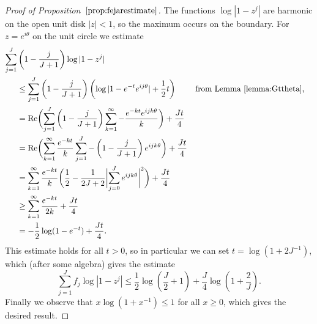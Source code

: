 \begin{proof}[Proof of Proposition~$\ref{prop:fejarestimate}$]
The functions $\log|1-z^j|$ are harmonic on the open unit disk $|z|<1$,
so the maximum occurs on the boundary. For $z=e^{i\theta}$ on the unit
circle we estimate
\begin{align*}
  \sum_{j=1}^J&\left(1-\frac{j}{J+1}\right)\log|1-z^j|\\
  &\le \sum_{j=1}^J \left(1-\frac{j}{J+1}\right) 
                    \left(\log|1-e^{-t}e^{ij\theta}| + \frac12t\right)
   &&\text{from Lemma \ref{lemma:Gttheta},} \\
  &= {\operatorname{Re}}\biggl(
      \sum_{j=1}^J \left(1-\frac{j}{J+1}\right) 
                       \sum_{k=1}^\infty -\frac{e^{-kt}e^{ijk\theta}}{k} \biggr)
     + \frac{Jt}{4} \\
  &= {\operatorname{Re}}\biggl(
      \sum_{k=1}^\infty \frac{e^{-kt}}{k}\sum_{j=1}^J 
          -\left(1-\frac{j}{J+1}\right)e^{ijk\theta} \biggr)+ \frac{Jt}{4} \\
  &=       \sum_{k=1}^\infty \frac{e^{-kt}}{k}
           \biggl(\frac12
           -\frac{1}{2J+2}\biggl|\sum_{j=0}^Je^{ijk\theta}\biggr|^2\biggr)
     + \frac{Jt}{4} \hidewidth\\
  &\ge \sum_{k=1}^\infty \frac{e^{-kt}}{2k} + \frac{Jt}{4} \\
  &= -\frac12\log(1-e^{-t}) + \frac{Jt}{4}.
\end{align*}
This estimate holds for all $t>0$, so in particular we can
set $t=\log(1+2J^{-1})$, which (after some algebra) gives the estimate
\[
  \sum_{j=1}^J f_j\log|1-z^j|
  \le \frac12\log\left(\frac{J}{2}+1\right)
      +\frac{J}{4}\log\left(1+\frac{2}{J}\right).
\]
Finally we observe that $x\log(1+x^{-1})\le 1$ for all $x\ge0$, which
gives the desired result.
\end{proof}


